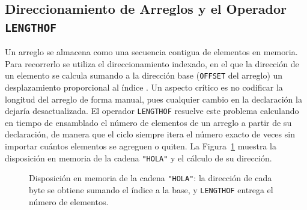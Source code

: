 \documentclass[a4paper,12pt]{article}
\begin{document}
\subsection{Direccionamiento de Arreglos y el Operador \texttt{LENGTHOF}}
Un arreglo se almacena como una secuencia contigua de elementos en memoria. Para recorrerlo se utiliza el direccionamiento indexado, en el que la dirección de un elemento se calcula sumando a la dirección base (\texttt{OFFSET} del arreglo) un desplazamiento proporcional al índice \cite{stallings2019computer}. Un aspecto crítico es no codificar la longitud del arreglo de forma manual, pues cualquier cambio en la declaración la dejaría desactualizada. El operador \texttt{LENGTHOF} resuelve este problema calculando en tiempo de ensamblado el número de elementos de un arreglo a partir de su declaración, de manera que el ciclo siempre itera el número exacto de veces sin importar cuántos elementos se agreguen o quiten. La Figura~\ref{fig:arreglo} muestra la disposición en memoria de la cadena \texttt{"HOLA"} y el cálculo de su dirección.

\begin{figure}[H]
\centering
{}
\caption{Disposición en memoria de la cadena \texttt{"HOLA"}: la dirección de cada byte se obtiene sumando el índice a la base, y \texttt{LENGTHOF} entrega el número de elementos.}
\label{fig:arreglo}
\end{figure}
\end{document}
